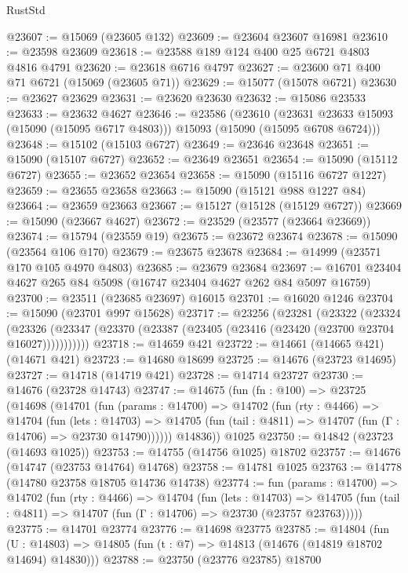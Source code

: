 \begin{lexlean}{RustStd}
\begin{coremodule}
@23607 := @15069 (@23605 @132)
@23609 := @23604 @23607 @16981
@23610 := @23598 @23609
@23618 := @23588 @189 @124 @400 @25 @6721 @4803 @4816 @4791
@23620 := @23618 @6716 @4797
@23627 := @23600 @71 @400 @71 @6721 (@15069 (@23605 @71))
@23629 := @15077 (@15078 @6721)
@23630 := @23627 @23629
@23631 := @23620 @23630
@23632 := @15086 @23533
@23633 := @23632 @4627
@23646 := @23586
    (@23610
      (@23631 @23633 @15093 (@15090 (@15095 @6717 @4803)))
      @15093
      (@15090 (@15095 @6708 @6724)))
@23648 := @15102 (@15103 @6727)
@23649 := @23646 @23648
@23651 := @15090 (@15107 @6727)
@23652 := @23649 @23651
@23654 := @15090 (@15112 @6727)
@23655 := @23652 @23654
@23658 := @15090 (@15116 @6727 @1227)
@23659 := @23655 @23658
@23663 := @15090 (@15121 @988 @1227 @84)
@23664 := @23659 @23663
@23667 := @15127 (@15128 (@15129 @6727))
@23669 := @15090 (@23667 @4627)
@23672 := @23529 (@23577 (@23664 @23669))
@23674 := @15794 (@23559 @19)
@23675 := @23672 @23674
@23678 := @15090 (@23564 @106 @170)
@23679 := @23675 @23678
@23684 := @14999 (@23571 @170 @105 @4970 @4803)
@23685 := @23679 @23684
@23697 := @16701 @23404 @4627 @265 @84 @5098 (@16747 @23404 @4627 @262 @84 @5097 @16759)
@23700 := @23511 (@23685 @23697) @16015
@23701 := @16020 @1246
@23704 := @15090 (@23701 @997 @15628)
@23717 := @23256
    (@23281
      (@23322
        (@23324
          (@23326 (@23347 (@23370 (@23387 (@23405 (@23416 (@23420 (@23700 @23704 @16027)))))))))))
@23718 := @14659 @421
@23722 := @14661 (@14665 @421) (@14671 @421)
@23723 := @14680 @18699
@23725 := @14676 (@23723 @14695)
@23727 := @14718 (@14719 @421)
@23728 := @14714 @23727
@23730 := @14676 (@23728 @14743)
@23747 := @14675
    (fun (fn : @100) =>
    @23725
      (@14698
        (@14701
          (fun (params : @14700) =>
          @14702
            (fun (rty : @4466) =>
            @14704
              (fun (lets : @14703) =>
              @14705 (fun (tail : @4811) => @14707 (fun (Γ : @14706) => @23730 @14790))))))
        @14836))
    @1025
@23750 := @14842 (@23723 (@14693 @1025))
@23753 := @14755 (@14756 @1025) @18702
@23757 := @14676 (@14747 (@23753 @14764) @14768)
@23758 := @14781 @1025
@23763 := @14778 (@14780 @23758 @18705 @14736 @14738)
@23774 := fun (params : @14700) =>
  @14702
    (fun (rty : @4466) =>
    @14704
      (fun (lets : @14703) =>
      @14705 (fun (tail : @4811) => @14707 (fun (Γ : @14706) => @23730 (@23757 @23763)))))
@23775 := @14701 @23774
@23776 := @14698 @23775
@23785 := @14804
    (fun (U : @14803) => @14805 (fun (t : @7) => @14813 (@14676 (@14819 @18702 @14694) @14830)))
@23788 := @23750 (@23776 @23785) @18700

\end{coremodule}
\end{lexlean}
